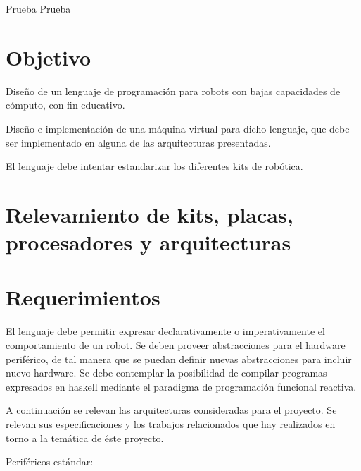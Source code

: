 

Prueba \cite{Arduino:2014:Misc}
Prueba \cite{SimmonsApfelbaum}

\section{Objetivo}

Diseño de un lenguaje de programación para robots con bajas capacidades de cómputo, con fin educativo.

Diseño e implementación de una máquina virtual para dicho lenguaje, que debe ser implementado en alguna de las
arquitecturas presentadas.

El lenguaje debe intentar estandarizar los diferentes kits de robótica.

\section{Relevamiento de kits, placas, procesadores y arquitecturas}


\section{Requerimientos}

El lenguaje debe permitir expresar declarativamente o imperativamente el 
comportamiento de un robot.
Se deben proveer abstracciones para el hardware periférico, de tal manera que 
se puedan definir nuevas abstracciones para incluir nuevo hardware.
Se debe contemplar la posibilidad de compilar programas expresados en haskell 
mediante el paradigma de programación funcional reactiva.

A continuación se relevan las arquitecturas consideradas para el proyecto.
Se relevan sus especificaciones y los trabajos relacionados que hay realizados
 en torno a la temática de éste proyecto.

Periféricos estándar:

